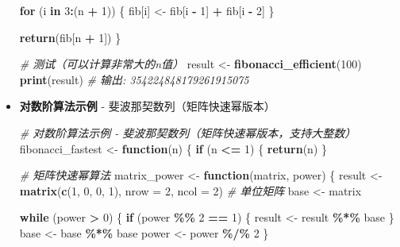 \documentclass[
  twoside]{book}
\newenvironment{Shaded}{\begin{snugshade}}{\end{snugshade}}
\newcommand{\AttributeTok}[1]{\textcolor[rgb]{0.13,0.29,0.53}{#1}}
\newcommand{\CommentTok}[1]{\textcolor[rgb]{0.56,0.35,0.01}{\textit{#1}}}
\newcommand{\ControlFlowTok}[1]{\textcolor[rgb]{0.13,0.29,0.53}{\textbf{#1}}}
\newcommand{\DecValTok}[1]{\textcolor[rgb]{0.00,0.00,0.81}{#1}}
\newcommand{\FunctionTok}[1]{\textcolor[rgb]{0.13,0.29,0.53}{\textbf{#1}}}
\newcommand{\NormalTok}[1]{#1}
\newcommand{\OtherTok}[1]{\textcolor[rgb]{0.56,0.35,0.01}{#1}}
\newcommand{\SpecialCharTok}[1]{\textcolor[rgb]{0.81,0.36,0.00}{\textbf{#1}}}
\begin{document}
\begin{itemize}
\begin{Shaded}
\begin{Highlighting}[]
\ControlFlowTok{for}\NormalTok{ (i }\ControlFlowTok{in} \DecValTok{3}\SpecialCharTok{:}\NormalTok{(n }\SpecialCharTok{+} \DecValTok{1}\NormalTok{)) \{}
\NormalTok{  fib[i] }\OtherTok{\textless{}{-}}\NormalTok{ fib[i }\SpecialCharTok{{-}} \DecValTok{1}\NormalTok{] }\SpecialCharTok{+}\NormalTok{ fib[i }\SpecialCharTok{{-}} \DecValTok{2}\NormalTok{]}
\NormalTok{\}}

\FunctionTok{return}\NormalTok{(fib[n }\SpecialCharTok{+} \DecValTok{1}\NormalTok{])}
\NormalTok{\}}

\CommentTok{\# 测试（可以计算非常大的n值）}
\NormalTok{result }\OtherTok{\textless{}{-}} \FunctionTok{fibonacci\_efficient}\NormalTok{(}\DecValTok{100}\NormalTok{)}
\FunctionTok{print}\NormalTok{(result)  }\CommentTok{\# 输出: 354224848179261915075}
\end{Highlighting}
\end{Shaded}
\item
  \textbf{对数阶算法示例} - 斐波那契数列（矩阵快速幂版本）

\begin{Shaded}
\begin{Highlighting}[]
\CommentTok{\# 对数阶算法示例 {-} 斐波那契数列（矩阵快速幂版本，支持大整数）}
\NormalTok{fibonacci\_fastest }\OtherTok{\textless{}{-}} \ControlFlowTok{function}\NormalTok{(n) \{}
  \ControlFlowTok{if}\NormalTok{ (n }\SpecialCharTok{\textless{}=} \DecValTok{1}\NormalTok{) \{}
    \FunctionTok{return}\NormalTok{(n)}
\NormalTok{  \}}

  \CommentTok{\# 矩阵快速幂算法}
\NormalTok{  matrix\_power }\OtherTok{\textless{}{-}} \ControlFlowTok{function}\NormalTok{(matrix, power) \{}
\NormalTok{    result }\OtherTok{\textless{}{-}} \FunctionTok{matrix}\NormalTok{(}\FunctionTok{c}\NormalTok{(}\DecValTok{1}\NormalTok{, }\DecValTok{0}\NormalTok{, }\DecValTok{0}\NormalTok{, }\DecValTok{1}\NormalTok{), }\AttributeTok{nrow =} \DecValTok{2}\NormalTok{, }\AttributeTok{ncol =} \DecValTok{2}\NormalTok{)  }\CommentTok{\# 单位矩阵}
\NormalTok{    base }\OtherTok{\textless{}{-}}\NormalTok{ matrix}

    \ControlFlowTok{while}\NormalTok{ (power }\SpecialCharTok{\textgreater{}} \DecValTok{0}\NormalTok{) \{}
      \ControlFlowTok{if}\NormalTok{ (power }\SpecialCharTok{\%\%} \DecValTok{2} \SpecialCharTok{==} \DecValTok{1}\NormalTok{) \{}
\NormalTok{        result }\OtherTok{\textless{}{-}}\NormalTok{ result }\SpecialCharTok{\%*\%}\NormalTok{ base}
\NormalTok{      \}}
\NormalTok{      base }\OtherTok{\textless{}{-}}\NormalTok{ base }\SpecialCharTok{\%*\%}\NormalTok{ base}
\NormalTok{      power }\OtherTok{\textless{}{-}}\NormalTok{ power }\SpecialCharTok{\%/\%} \DecValTok{2}
\NormalTok{    \}}


\end{Highlighting}
\end{Shaded}
\end{itemize}
\end{document}
